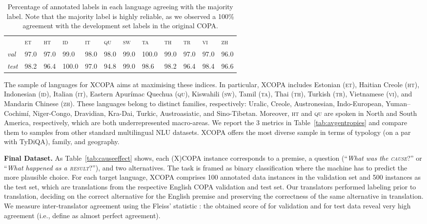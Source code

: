 \documentclass[11pt,a4paper]{article}
\begin{document}
\begin{table*}[!t]
    \def\arraystretch{0.94}
    \centering
    {\small
    \begin{tabularx}{1.0\textwidth}{l|YYYYYYYYYYY}
    \toprule
& \textsc{et} & \textsc{ht} & \textsc{id} & \textsc{it} & \textsc{qu} & \textsc{sw} & \textsc{ta} & \textsc{th} & \textsc{tr} & \textsc{vi} & \textsc{zh}\\
\cmidrule(lr){2-12}
\textit{val} & 97.0 & 97.0 & 99.0 & 98.0 & 98.0 & 99.0 & 100.0 & 99.0 & 97.0 & 97.0 & 96.0\\
\textit{test} &  98.2 & 96.4 & 100.0 & 97.0 & 94.8 & 99.0 & 98.6 & 98.2 & 96.4 & 98.4 & 96.6\\
\bottomrule
    \end{tabularx}}\caption{Percentage of annotated labels in each language agreeing with the majority label. Note that the majority label is highly reliable, as we observed a 100\% agreement with the development set labels in the original COPA.}
    \label{tab:overlap}
    \vspace{-1.5mm}
\end{table*}

The sample of languages for XCOPA aims at maximising these indices. In particular, XCOPA includes Estonian (\textsc{et}), Haitian Creole (\textsc{ht}), Indonesian (\textsc{id}), Italian (\textsc{it}), Eastern Apurímac Quechua (\textsc{qu}), Kiswahili (\textsc{sw}), Tamil (\textsc{ta}), Thai (\textsc{th}), Turkish (\textsc{tr}), Vietnamese (\textsc{vi}), and Mandarin Chinese (\textsc{zh}). These languages belong to distinct families, respectively: Uralic, Creole, Austronesian, Indo-European, Yuman–Cochimí, Niger-Congo, Dravidian, Kra-Dai, Turkic, Austroasiatic, and Sino-Tibetan. Moreover, \textsc{ht} and \textsc{qu} are spoken in North and South America, respectively, which are both underrepresented macro-areas. We report the 3 metrics in Table~\ref{tab:avgentropies} and compare them to samples from other standard multilingual NLU datasets. XCOPA offers the most diverse sample in terms of typology (on a par with TyDiQA), family, and geography. 

\vspace{1.4mm}
\noindent \textbf{Final Dataset.}
As Table~\ref{tab:causeeffect} shows, each (X)COPA instance corresponds to a premise, a question (``\textit{What was the \textsc{cause}}?'' or ``\textit{What happened as a \textsc{result}}?''), and two alternatives. The task is framed as binary classification where the machine has to predict the more plausible choice. For each target language, XCOPA comprises 100 annotated data instances in the validation set and 500 instances as the test set, which are translations from the respective English COPA validation and test set. Our translators performed labeling prior to translation, deciding on the correct alternative for the English premise and preserving the correctness of the same alternative in translation. We measure inter-translator agreement using the Fleiss'  statistic \cite{fleiss1971measuring}: the obtained score of  for validation and  for test data reveal very high agreement (i.e., \citet{landis1977measurement} define  as almost perfect agreement).
\end{document}
